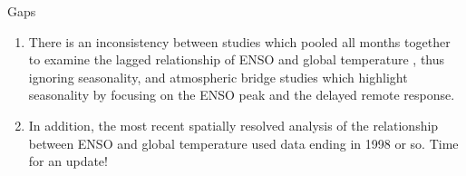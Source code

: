 \documentclass[aspectratio=169,xcolor=dvipsnames]{beamer}
\begin{document}
\begin{frame}{Gaps}
  \begin{enumerate}
  \item There is an inconsistency between studies which pooled all
    months together to examine the lagged relationship of ENSO and
    global temperature \citep[e.g.,][]{Trenberth2002evolution,
      Lean2008natural, Foster2011global}, thus ignoring seasonality,
    and atmospheric bridge studies which highlight seasonality by
    focusing on the ENSO peak and the delayed remote response.
    
  \item In addition, the most recent spatially resolved analysis of the
    relationship between ENSO and global temperature used data ending
    in 1998 or so. Time for an update!


  \end{enumerate}
\end{frame}


\end{document}

